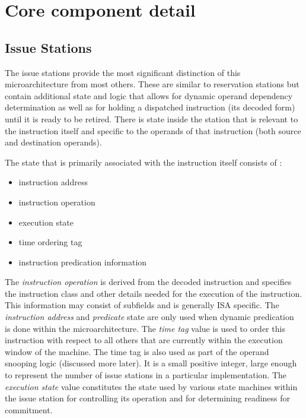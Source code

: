 \documentclass[10pt,twocolumn,dvips]{article}
\begin{document}
\section{Core component detail}
%
\subsection{Issue Stations}
%
The issue stations provide the most significant distinction of this
microarchitecture from most others.  
These are similar to reservation stations
but contain additional state and logic that allows
for dynamic operand dependency determination as well as
for holding a dispatched instruction (its decoded form) 
until it is ready to be retired.  
There is state inside the station that is relevant to
the instruction itself and specific
to the operands of that instruction (both source and
destination operands).

The state that is primarily associated with the instruction itself
consists of :
%
\begin{itemize}
\vspace{-0.10in}
\item{instruction address}
\vspace{-0.10in}
\item{instruction operation}
\vspace{-0.10in}
\item{execution state}
\vspace{-0.10in}
\item{time ordering tag}
\vspace{-0.10in}
\item{instruction predication information}
\vspace{-0.10in}
\end{itemize}   
%
The \textit{instruction operation} is derived from the decoded
instruction and specifies the instruction class and other
details needed for the execution of the instruction.
This information may consist of subfields and is generally ISA
specific.
The \textit{instruction address} and \textit{predicate} state
are only used when dynamic predication~\cite{undisclosed2}
is done within the microarchitecture.
The \textit{time tag} value is used to order this instruction
with respect to all others that are currently within the execution
window of the machine.
The time tag is also used as part of the operand snooping
logic (discussed more later).
It is a small positive integer, large enough to represent
the number of issue stations in a particular implementation.
The \textit{execution state} value constitutes the state
used by various state machines within the issue station
for controlling its operation and for determining readiness
for commitment.
\end{document}
